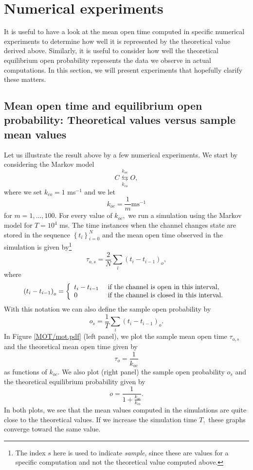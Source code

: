 \section{Numerical experiments}

It is useful to have a look at the mean open time computed in specific
numerical experiments to determine how well it is represented by the theoretical
value derived above. Similarly, it is useful to consider how well the
theoretical equilibrium open probability represents the data we observe in
actual computations. In this section, we will present experiments that
hopefully clarify these matters.

\subsection{Mean open time and equilibrium open probability: Theoretical
values versus sample mean values}

Let us illustrate the result above by a few numerical experiments. We start by
considering the Markov model%
\[
C\underset{k_{co}}{\overset{k_{oc}}{\leftrightarrows}}O,
\]
where we set $k_{co}=1$ ms$^{-1}$ and we let
\[
k_{oc}=\frac{1}{m}\text{ms}^{-1}%
\]
for $m=1,...,100.$ For every value of $k_{oc},$ we run a simulation using the
Markov model for $T=10^{4}$ ms. The time instances when the channel changes
state are stored in the sequence $\left\{  t_{i}\right\}  _{i=0}^{N}$ and the
mean open time observed in the simulation is given by\footnote{The
index $s$ here is used to indicate {\it sample}, since these are values for a
specific computation and not the theoretical value computed above.}
\[
\tau_{o,s}=\frac{2}{N}\sum_{i}\left(  t_{i}-t_{i-1}\right)  _{o},%
\]
where
\[
\left(  t_{i}-t_{i-1}\right)  _{o}=\left\{
\begin{array}
[c]{ll}%
t_{i}-t_{i-1}\text{ } & \text{if the channel is open in this interval,}\\
0\text{ } & \text{if the channel is closed in this interval.}%
\end{array}
\text{ }\right.
\]
With this notation we can also define the sample open probability by%
\[
o_{s}=\frac{1}{T}\sum_{i}\left(  t_{i}-t_{i-1}\right)  _{o}.
\]
In Figure  \ref{MOT/mot.pdf} (left panel), we plot the sample mean open time 
$\tau_{o,s}$ and the theoretical mean open time given by%
\begin{equation}
\tau_{o}=\frac{1}{k_{oc}} \label{mot2}%
\end{equation}
as functions of $k_{oc}.$ We also plot (right panel) the sample open
probability $o_{s}$ and the theoretical equilibrium probability given by%
\begin{equation}
o=\frac{1}{1+\frac{k_{oc}}{k_{co}}}. \label{mot3}%
\end{equation}
In both plots, we see that the mean values computed in the simulations are
quite close to the theoretical values. If we increase the simulation time $T,$
these graphs converge toward the same value.

